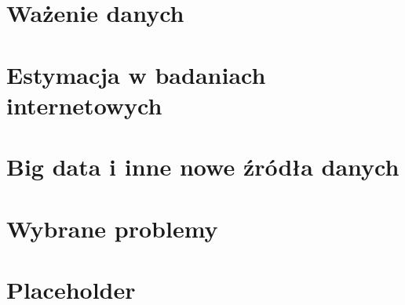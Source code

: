 \documentclass[]{book}
\begin{document}
\chapter{Ważenie danych}\label{wazenie-danych}

\chapter{Estymacja w badaniach
internetowych}\label{estymacja-w-badaniach-internetowych}

\chapter{Big data i inne nowe źródła
danych}\label{big-data-i-inne-nowe-zroda-danych}

\chapter{Wybrane problemy}\label{wybrane-problemy}

\chapter{Placeholder}\label{placeholder}


\end{document}
